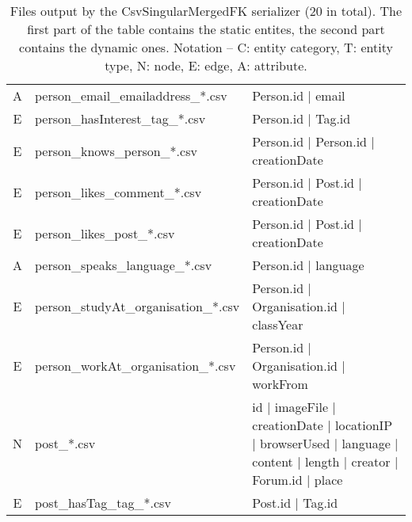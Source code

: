 \begin{table}[htb]
{\begin{tabular}{|c|l|l|}
            A                    & person\_email\_emailaddress\_*.csv   & Person.id | email                                                                                                   \\
            E                    & person\_hasInterest\_tag\_*.csv      & Person.id | Tag.id                                                                                                  \\
            E                    & person\_knows\_person\_*.csv         & Person.id | Person.id | creationDate                                                                                \\
            E                    & person\_likes\_comment\_*.csv        & Person.id | Post.id | creationDate                                                                                  \\
            E                    & person\_likes\_post\_*.csv           & Person.id | Post.id | creationDate                                                                                  \\
            A                    & person\_speaks\_language\_*.csv      & Person.id | language                                                                                                \\
            E                    & person\_studyAt\_organisation\_*.csv & Person.id | Organisation.id | classYear                                                                             \\
            E                    & person\_workAt\_organisation\_*.csv  & Person.id | Organisation.id | workFrom                                                                              \\\hline
            N                    & post\_*.csv                          & id | imageFile | creationDate | locationIP | browserUsed | language | content | length | creator | Forum.id | place \\
            E                    & post\_hasTag\_tag\_*.csv             & Post.id | Tag.id                                                                                                    \\\hline
        \end{tabular}}
    \caption{Files output by the CsvSingularMergedFK serializer (20 in total). The first part of the table contains the static entites, the second part contains the dynamic ones. Notation -- C: entity category, T: entity type, N: node, E: edge, A: attribute.}
    \label{table:csv-singular-mergedfk}
\end{table}
